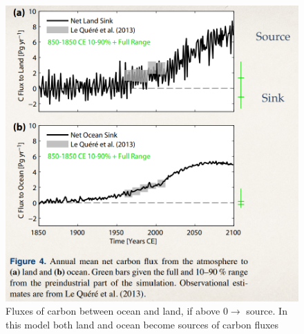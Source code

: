 \begin{figure}[htpb]
	\centering
	\includegraphics[width=0.5\linewidth]{uploads/sources.png}
	\caption{Fluxes of carbon between ocean and land, if above $0\rightarrow$ source. In this model both land and ocean become sources of carbon fluxes}
	\label{fig:enter-label}
\end{figure}
